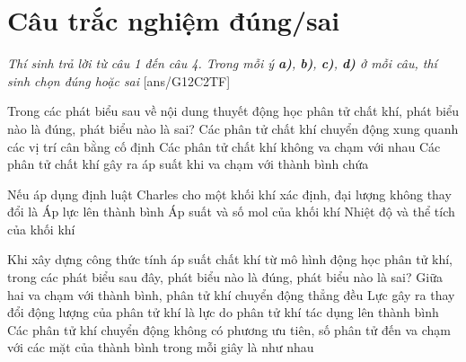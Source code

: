 \section{Câu trắc nghiệm đúng/sai} 
\textit{Thí sinh trả lời từ câu 1 đến câu 4. Trong mỗi ý \textbf{a)}, \textbf{b)}, \textbf{c)}, \textbf{d)} ở mỗi câu, thí sinh chọn đúng hoặc sai}
\setcounter{ex}{0}
[ans/G12C2TF]
\begin{ex}
Trong các phát biểu sau về nội dung thuyết động học phân tử chất khí, phát biểu nào là đúng, phát biểu nào là sai?	
	{Các phân tử chất khí chuyển động xung quanh các vị trí cân bằng cố định}
	{Các phân tử chất khí không va chạm với nhau}
	{\True Các phân tử chất khí gây ra áp suất khi va chạm với thành bình chứa}
	\loigiai{
		
	}
\end{ex}
\begin{ex}
Nếu áp dụng định luật Charles cho một khối khí xác định, đại lượng không thay đổi là	
	{\True Áp lực lên thành bình}
	{\True Áp suất và số mol của khối khí}
	{Nhiệt độ và thể tích của khối khí}
	\loigiai{
		
	}
\end{ex}
\begin{ex}
Khi xây dựng công thức tính áp suất chất khí từ mô hình động học phân tử khí, trong các phát biểu sau đây, phát biểu nào là đúng, phát biểu nào là sai?	
	{\True Giữa hai va chạm với thành bình, phân tử khí chuyển động thẳng đều}
	{Lực gây ra thay đổi động lượng của phân tử khí là lực do phân tử khí tác dụng lên thành bình}
	{\True Các phân tử khí chuyển động không có phương ưu tiên, số phân tử đến va chạm với các mặt của thành bình trong mỗi giây là như nhau}
\end{ex}
